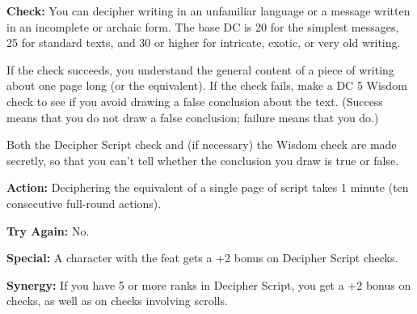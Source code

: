\textbf{Check:} You can decipher writing in an unfamiliar language or a message written in an incomplete or archaic form. The base DC is 20 for the simplest messages, 25 for standard texts, and 30 or higher for intricate, exotic, or very old writing.

If the check succeeds, you understand the general content of a piece of writing about one page long (or the equivalent). If the check fails, make a DC 5 Wisdom check to see if you avoid drawing a false conclusion about the text. (Success means that you do not draw a false conclusion; failure means that you do.)

Both the Decipher Script check and (if necessary) the Wisdom check are made secretly, so that you can't tell whether the conclusion you draw is true or false.

\textbf{Action:} Deciphering the equivalent of a single page of script takes 1 minute (ten consecutive full-round actions).

\textbf{Try Again:} No.

\textbf{Special:} A character with the  feat gets a +2 bonus on Decipher Script checks.

\textbf{Synergy:} If you have 5 or more ranks in Decipher Script, you get a +2 bonus on  checks, as well as on  checks involving scrolls.